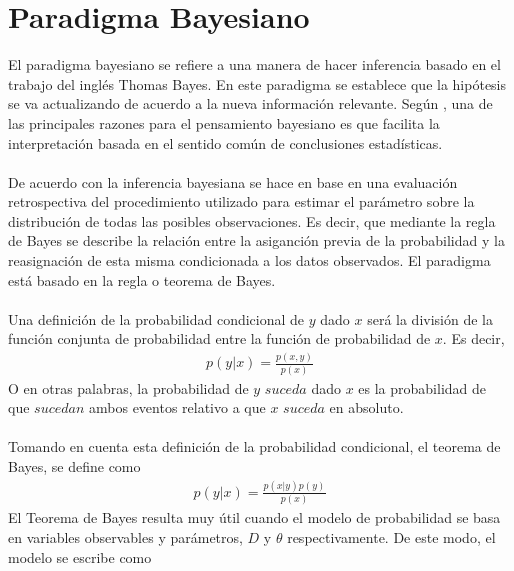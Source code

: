 \chapter{Paradigma Bayesiano}
El paradigma bayesiano se refiere a una manera de hacer inferencia basado en el trabajo del ingl\'es Thomas Bayes. En este paradigma se establece que la hip\'otesis se va actualizando de acuerdo a la nueva informaci\'on  relevante. Seg\'un \cite{gelman2014bayesian}, una de las principales razones para el pensamiento bayesiano es que facilita la interpretaci\'on basada en el sentido com\'un de conclusiones estad\'isticas. \\
\\
De acuerdo con \cite{gelman2014bayesian} la inferencia bayesiana se hace en base en una evaluaci\'on retrospectiva del procedimiento utilizado para estimar el par\'ametro sobre la distribuci\'on de todas las posibles observaciones. Es decir, que mediante la regla de Bayes se describe la relaci\'on entre la asiganci\'on previa de la probabilidad y la reasignaci\'on de esta misma condicionada a los datos observados. El paradigma est\'a basado en la regla o teorema de Bayes.\\
\\
Una definici\'on de la probabilidad condicional de $y$ dado $x$  ser\'a la divisi\'on de la funci\'on conjunta de probabilidad entre la funci\'on de probabilidad de $x$. Es decir,
\begin{align*}
p(y|x)=\frac{p(x,y)}{p(x)}
\end{align*}
O en otras palabras, la probabilidad de $y$ $suceda$ dado $x$ es la probabilidad de que $sucedan$ ambos eventos relativo a que $x$ $suceda$ en absoluto.\\
\\
Tomando en cuenta esta definici\'on de la probabilidad condicional, el teorema de Bayes, se define como
\begin{align*}
p(y|x)=\frac{p(x|y)p(y)}{p(x)}
\end{align*}
El Teorema de Bayes resulta muy \'util cuando el modelo de probabilidad se basa en variables observables y  par\'ametros, $D$ y $\theta$ respectivamente. De este modo, el modelo se escribe como

